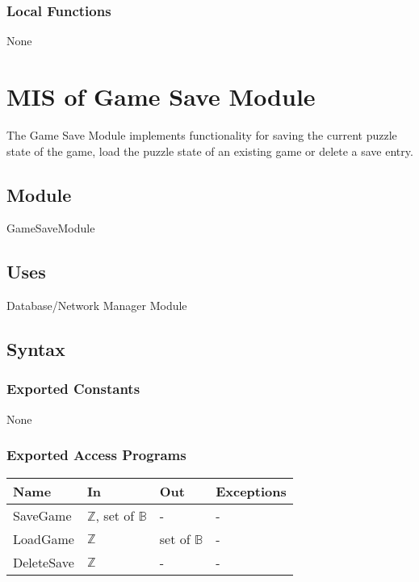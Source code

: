 \documentclass[12pt, titlepage]{article}
\begin{document}
\subsubsection{Local Functions}

None

\newpage

\section{MIS of Game Save Module} \label{SaveModule} 

The Game Save Module implements functionality for saving the current puzzle state of the game, load the puzzle state of an existing game or delete a save entry.

\subsection{Module}

GameSaveModule

\subsection{Uses}

Database/Network Manager Module

\subsection{Syntax}

\subsubsection{Exported Constants}

None

\subsubsection{Exported Access Programs}

\begin{center}
\begin{tabular}{p{5cm} p{4cm} p{4cm} p{2cm}}
\hline
\textbf{Name} & \textbf{In} & \textbf{Out} & \textbf{Exceptions} \\
\hline
SaveGame & $\mathbb{Z}$, set of $\mathbb{B}$ & - & - \\
LoadGame  & $\mathbb{Z}$ & set of $\mathbb{B}$ & - \\
DeleteSave  & $\mathbb{Z}$ & - & - \\
\hline
\end{tabular}
\end{center}
\end{document}
